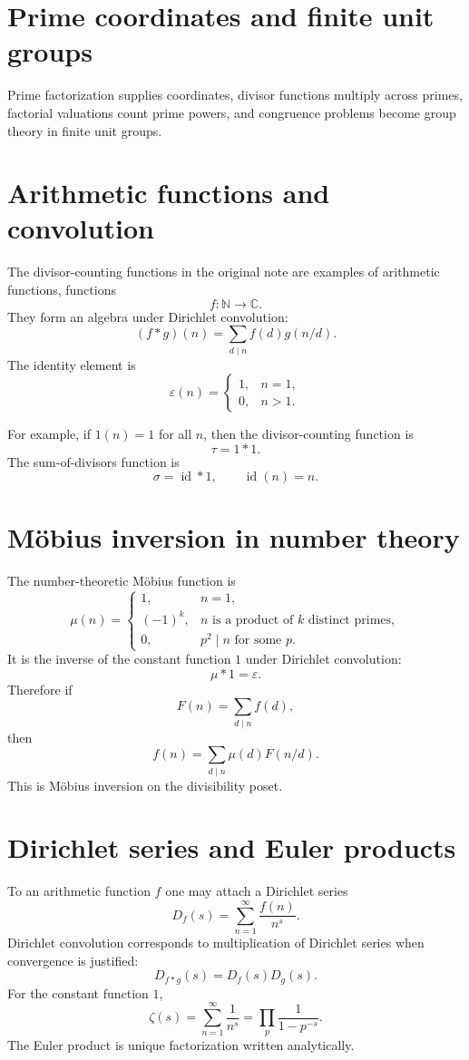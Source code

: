 \section{Prime coordinates and finite unit groups}
Prime factorization supplies coordinates, divisor functions multiply across primes, factorial valuations count prime powers, and congruence problems become group theory in finite unit groups.

\section{Arithmetic functions and convolution}

The divisor-counting functions in the original note are examples of arithmetic functions, functions
\[
  f:\mathbb N\to\mathbb C.
\]
They form an algebra under Dirichlet convolution:
\[
  (f*g)(n)=\sum_{d\mid n}f(d)g(n/d).
\]
The identity element is
\[
  \varepsilon(n)=
  \begin{cases}
  1,&n=1,\\
  0,&n>1.
  \end{cases}
\]

For example, if $1(n)=1$ for all $n$, then the divisor-counting function is
\[
  \tau=1*1.
\]
The sum-of-divisors function is
\[
  \sigma=\operatorname{id}*1,\qquad \operatorname{id}(n)=n.
\]

\section{Möbius inversion in number theory}

The number-theoretic Möbius function is
\[
  \mu(n)=
  \begin{cases}
  1,&n=1,\\
  (-1)^k,&n\text{ is a product of }k\text{ distinct primes},\\
  0,&p^2\mid n\text{ for some }p.
  \end{cases}
\]
It is the inverse of the constant function $1$ under Dirichlet convolution:
\[
  \mu*1=\varepsilon.
\]
Therefore if
\[
  F(n)=\sum_{d\mid n}f(d),
\]
then
\[
  f(n)=\sum_{d\mid n}\mu(d)F(n/d).
\]
This is Möbius inversion on the divisibility poset.

\section{Dirichlet series and Euler products}

To an arithmetic function $f$ one may attach a Dirichlet series
\[
  D_f(s)=\sum_{n=1}^{\infty}\frac{f(n)}{n^s}.
\]
Dirichlet convolution corresponds to multiplication of Dirichlet series when convergence is justified:
\[
  D_{f*g}(s)=D_f(s)D_g(s).
\]
For the constant function $1$,
\[
  \zeta(s)=\sum_{n=1}^{\infty}\frac1{n^s}=\prod_p \frac1{1-p^{-s}}.
\]
The Euler product is unique factorization written analytically.


